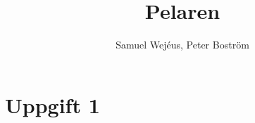 \documentclass[a4paper,10pt]{article}
\title{Pelaren}
\author{Samuel Wejéus, Peter Boström}
\begin{document}
	\section {Uppgift 1}
		
\end{document}
